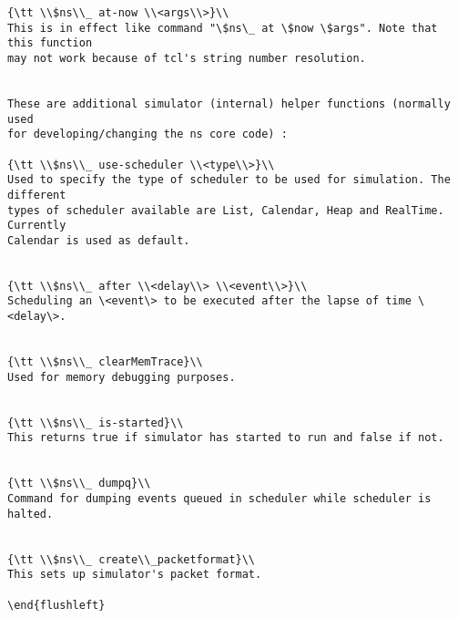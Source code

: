 \begin{verbatim}
{\tt \\$ns\\_ at-now \\<args\\>}\\
This is in effect like command "\$ns\_ at \$now \$args". Note that this function
may not work because of tcl's string number resolution.


These are additional simulator (internal) helper functions (normally used
for developing/changing the ns core code) :

{\tt \\$ns\\_ use-scheduler \\<type\\>}\\
Used to specify the type of scheduler to be used for simulation. The different
types of scheduler available are List, Calendar, Heap and RealTime. Currently
Calendar is used as default.


{\tt \\$ns\\_ after \\<delay\\> \\<event\\>}\\
Scheduling an \<event\> to be executed after the lapse of time \<delay\>.


{\tt \\$ns\\_ clearMemTrace}\\
Used for memory debugging purposes.


{\tt \\$ns\\_ is-started}\\
This returns true if simulator has started to run and false if not.


{\tt \\$ns\\_ dumpq}\\
Command for dumping events queued in scheduler while scheduler is halted.


{\tt \\$ns\\_ create\\_packetformat}\\
This sets up simulator's packet format.

\end{flushleft}
\end{verbatim}

\endinput
